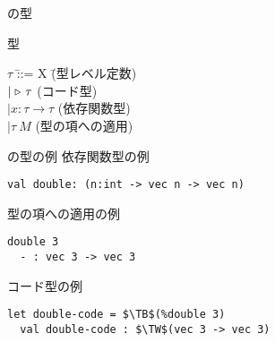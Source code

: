 \documentclass[dvipdfmx,aspectratio=169, 20pt]{beamer}
\begin{document}
\begin{frame}[fragile]{\LMD の型}
    \begin{block}{型}
        \begin{tabbing}
            \hspace{5mm} \( \tau \) \= ::= X \hspace{20mm} \= (型レベル定数) \\
            \> \( \mid {\mathop{\triangleright}}\ \tau \) \> (コード型) \\
            \> \( \mid x:\tau \to \tau \) \> (依存関数型) \\
            \> \( \mid \tau\ M \) \> (型の項への適用)
        \end{tabbing}
    \end{block}
\end{frame}

\begin{frame}[fragile]{\LMD の型の例}
    依存関数型の例
    \begin{exampleblock}{}
        \begin{Verbatim}[commandchars=\\\{\},codes={\catcode`$=3\catcode`^=7}]
  val double: (n:int -> vec n -> vec n)
        \end{Verbatim}
    \end{exampleblock}
    型の項への適用の例
    \begin{exampleblock}{}
        \begin{Verbatim}[commandchars=\\\{\},codes={\catcode`$=3\catcode`^=7}]
  double 3
  - : vec 3 -> vec 3
        \end{Verbatim}
    \end{exampleblock}
    コード型の例
    \begin{exampleblock}{}
        \begin{Verbatim}[commandchars=\\\{\},codes={\catcode`$=3\catcode`^=7}]
  let double-code = $\TB$(%double 3)
  val double-code : $\TW$(vec 3 -> vec 3)
        \end{Verbatim}
    \end{exampleblock}
\end{frame}
\end{document}
